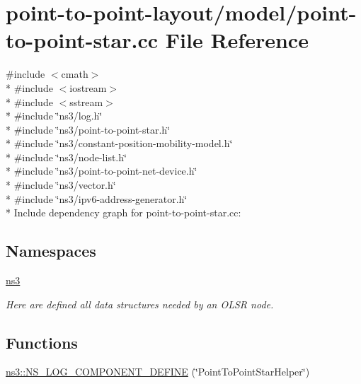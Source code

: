 \hypertarget{point-to-point-star_8cc}{}\section{point-\/to-\/point-\/layout/model/point-\/to-\/point-\/star.cc File Reference}
\label{point-to-point-star_8cc}
{\ttfamily \#include $<$cmath$>$}\\*
{\ttfamily \#include $<$iostream$>$}\\*
{\ttfamily \#include $<$sstream$>$}\\*
{\ttfamily \#include \char`\"{}ns3/log.\+h\char`\"{}}\\*
{\ttfamily \#include \char`\"{}ns3/point-\/to-\/point-\/star.\+h\char`\"{}}\\*
{\ttfamily \#include \char`\"{}ns3/constant-\/position-\/mobility-\/model.\+h\char`\"{}}\\*
{\ttfamily \#include \char`\"{}ns3/node-\/list.\+h\char`\"{}}\\*
{\ttfamily \#include \char`\"{}ns3/point-\/to-\/point-\/net-\/device.\+h\char`\"{}}\\*
{\ttfamily \#include \char`\"{}ns3/vector.\+h\char`\"{}}\\*
{\ttfamily \#include \char`\"{}ns3/ipv6-\/address-\/generator.\+h\char`\"{}}\\*
Include dependency graph for point-\/to-\/point-\/star.cc\+:
\subsection*{Namespaces}
\begin{DoxyCompactItemize}
\item 
 \hyperlink{namespacens3}{ns3}
\begin{DoxyCompactList}\small\item\em Here are defined all data structures needed by an O\+L\+SR node. \end{DoxyCompactList}\end{DoxyCompactItemize}
\subsection*{Functions}
\begin{DoxyCompactItemize}
\item 
\hyperlink{namespacens3_a20977015b9b4f7d2557741254ce3b0ab}{ns3\+::\+N\+S\+\_\+\+L\+O\+G\+\_\+\+C\+O\+M\+P\+O\+N\+E\+N\+T\+\_\+\+D\+E\+F\+I\+NE} (\char`\"{}Point\+To\+Point\+Star\+Helper\char`\"{})
\end{DoxyCompactItemize}
